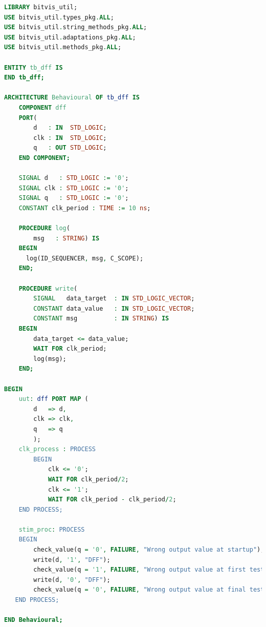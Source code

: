 \documentclass[11pt,british]{article}
\newcommand\blankpage{%
    \null
    \thispagestyle{empty}%
    \addtocounter{page}{-1}%
    \newpage}
\begin{document}
\begin{appendices}
\begin{lstlisting}[language=VHDL, tabsize=4, frame=single, framesep=2mm, belowskip=4pt, aboveskip=4pt, showstringspaces=false, basicstyle=\scriptsize]
LIBRARY bitvis_util;
USE bitvis_util.types_pkg.ALL;
USE bitvis_util.string_methods_pkg.ALL;
USE bitvis_util.adaptations_pkg.ALL;
USE bitvis_util.methods_pkg.ALL;

ENTITY tb_dff IS
END tb_dff;

ARCHITECTURE Behavioural OF tb_dff IS
	COMPONENT dff
    PORT(
		d 	: IN  STD_LOGIC;
        clk : IN  STD_LOGIC;
		q 	: OUT STD_LOGIC;
    END COMPONENT;
    
	SIGNAL d   : STD_LOGIC := '0';
	SIGNAL clk : STD_LOGIC := '0';
	SIGNAL q   : STD_LOGIC := '0';
	CONSTANT clk_period : TIME := 10 ns;
	
	PROCEDURE log(
    	msg   : STRING) IS
    BEGIN
      log(ID_SEQUENCER, msg, C_SCOPE);
    END;
    
	PROCEDURE write(
    	SIGNAL   data_target  : IN STD_LOGIC_VECTOR;
    	CONSTANT data_value   : IN STD_LOGIC_VECTOR;
    	CONSTANT msg          : IN STRING) IS
    BEGIN
    	data_target <= data_value;
    	WAIT FOR clk_period;
    	log(msg);
    END;
	
BEGIN
	uut: dff PORT MAP (
        d 	=> d,
        clk => clk,
		q 	=> q
        );
	clk_process : PROCESS
		BEGIN
			clk <= '0';
			WAIT FOR clk_period/2;
			clk <= '1';
			WAIT FOR clk_period - clk_period/2;
	END PROCESS;
	
	stim_proc: PROCESS
	BEGIN		
		check_value(q = '0', FAILURE, "Wrong output value at startup");
		write(d, '1', "DFF");
		check_value(q = '1', FAILURE, "Wrong output value at first test");
		write(d, '0', "DFF");
		check_value(q = '0', FAILURE, "Wrong output value at final test");
   END PROCESS;
   
END Behavioural;
\end{lstlisting}

\end{appendices}


%


\afterpage{\blankpage}
\end{document}
